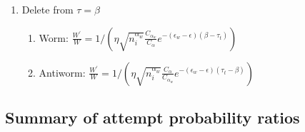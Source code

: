 \documentclass[12pt, two sided]{article}
\begin{document}
\begin{enumerate}
    \item Delete from $\tau=\beta$
    	\begin{enumerate}
	\item{Worm: $\frac{W^\prime}{W}= 1/( \eta \sqrt{n_i^{\alpha_w}} \frac{C_{\alpha_w}}{C_{\alpha}}e^{-(\epsilon_w-\epsilon)(\beta-\tau_t)})$}
	\item{Antiworm: $\frac{W^\prime}{W}= 1/(\eta \sqrt{n_i^{\alpha_w}} \frac{C_{\alpha}}{C_{\alpha_w}}e^{-(\epsilon_w-\epsilon)(\tau_t - \beta)})$}
	\end{enumerate}
	
    \end{enumerate}

\subsection{Summary of attempt probability ratios}
\end{document}
